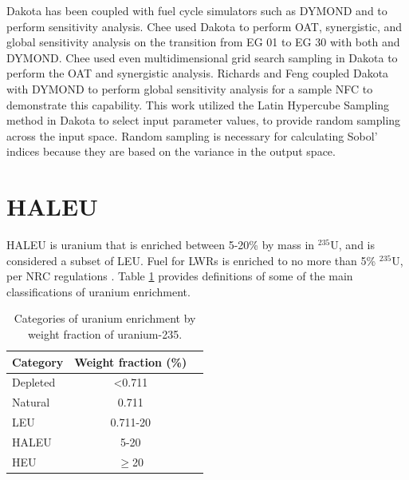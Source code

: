 Dakota has been coupled with fuel cycle simulators such as \gls{DYMOND} and 
\Cyclus 
\cite{chee_sensitivity_2019,richards_application_2021} to perform sensitivity 
analysis. Chee \cite{chee_sensitivity_2019} used Dakota to perform 
\gls{OAT}, synergistic, and global sensitivity analysis on the transition 
from \gls{EG} 01 to \gls{EG} 30 with both \Cyclus and \gls{DYMOND}. Chee used even 
multidimensional grid search sampling in Dakota to perform the \gls{OAT} 
and synergistic analysis. 
Richards and Feng \cite{richards_application_2021} coupled Dakota with 
\gls{DYMOND} to perform global sensitivity analysis for a sample \gls{NFC} 
to demonstrate this capability. This work utilized the Latin Hypercube 
Sampling method in Dakota to select input parameter values, to provide 
random sampling across the input space. Random sampling is necessary for 
calculating Sobol' indices because they are based on the variance in 
the output space. 


%
%
%
\section{HALEU}
\gls{HALEU} is uranium that is enriched between 5-20\% by mass in 
$^{235}$U, and is considered a subset of \gls{LEU}. Fuel for \glspl{LWR} 
is enriched to no more than 5\% $^{235}$U, per \gls{NRC} regulations 
\cite{noauthor_criticality_2006}. Table \ref{tab:enrichemnt} provides definitions 
of some of the 
main classifications of uranium enrichment. 

\begin{table}
    \centering
    \caption{Categories of uranium enrichment by weight fraction of 
    uranium-235.}
    \label{tab:enrichemnt}
    \begin{tabular}{l c c}
        \hline
        Category & Weight fraction (\%)\\\hline
        Depleted & <0.711 \\
        Natural & 0.711 \\
        \gls{LEU} & 0.711-20 \\
        \gls{HALEU} & 5-20 \\
        \gls{HEU} & $\ge$20 \\
        \hline
    \end{tabular}
\end{table}

